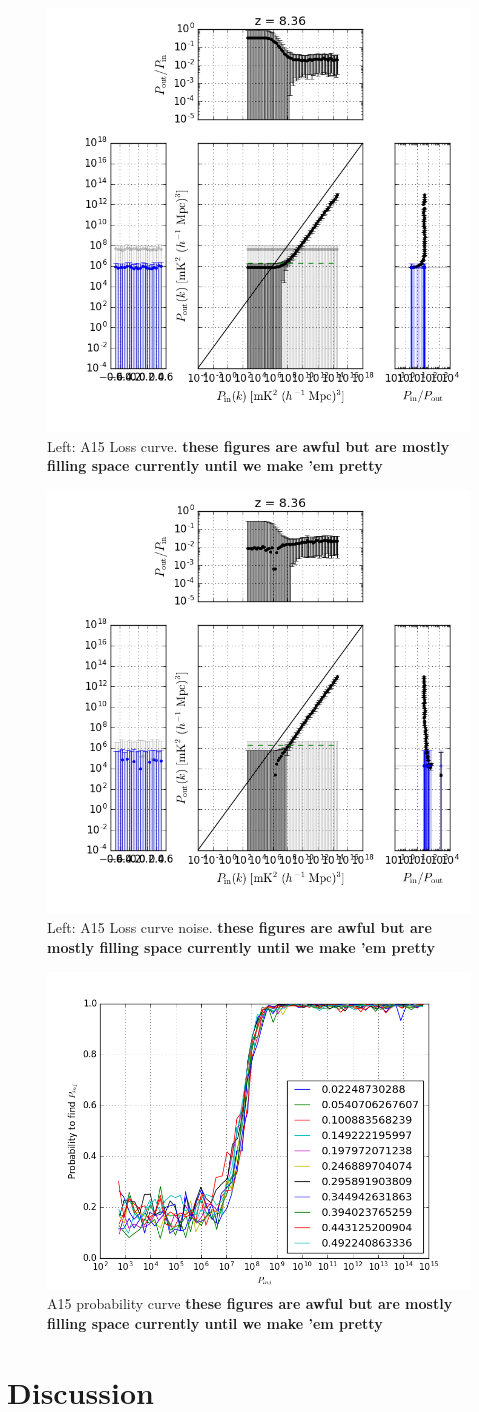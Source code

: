 \documentclass[preprint2,hidelinks]{emulateapj}
\begin{document}
\begin{figure}[t]
\centering
\includegraphics[width=.45\textwidth]{ali_reconstruction_loss_curve.png}
\caption{Left: A15 Loss curve. %
{\bf \color{red} these figures are awful but are mostly filling space currently until we make 'em pretty} \label{fig:sigloss_data}}

\end{figure}


\begin{figure}[t]
\centering
\includegraphics[width=.45\textwidth]{ali_noise_loss_curve.png}
\caption{Left: A15 Loss curve noise. %
{\bf \color{red} these figures are awful but are mostly filling space currently until we make 'em pretty} \label{fig:sigloss_noise}}
\end{figure}


\begin{figure}[t]
\centering
\includegraphics[width=.45\textwidth]{ali_noise_probability.png}
\caption{A15 probability curve %
{\bf \color{red} these figures are awful but are mostly filling space currently until we make 'em pretty} \label{fig:ali_noise_prob}}
\end{figure}

\section{Discussion}\label{sec:discussion}{

}



\end{document}
